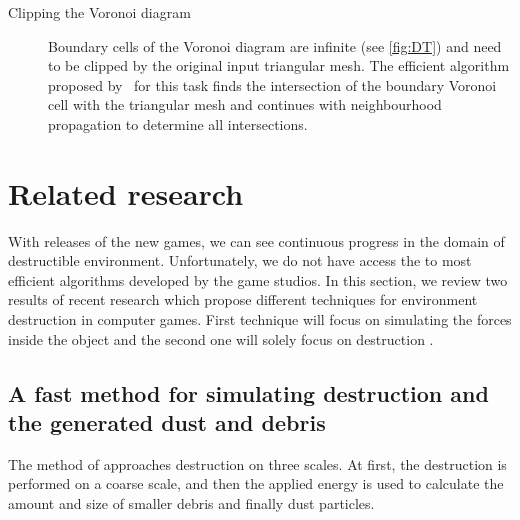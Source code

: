\begin{description}
    \item[Clipping the Voronoi diagram] Boundary cells of the Voronoi diagram are infinite (see \cref{fig:DT}) and need to be clipped by the original input triangular mesh. The efficient algorithm proposed by~\citet{yan2010efficient} for this task finds the intersection of the boundary Voronoi cell with the triangular mesh and continues with neighbourhood propagation to determine all intersections. 
\end{description}


\section{Related research}
With releases of the new games, we can see continuous progress in the domain of destructible environment. Unfortunately, we do not have access the to most efficient algorithms developed by the game studios. In this section, we review two results of recent research which propose different techniques for environment destruction in computer games. First technique will focus on simulating the forces inside the object and the second one will solely focus on destruction .

\subsection{A fast method for simulating destruction and the generated dust
and debris}
\label{sec:edem}
The method of \citet{edem}  approaches destruction on three scales. At first, the destruction is performed on a coarse scale, and then the applied energy is used to calculate the amount and size of smaller debris and finally dust particles.

